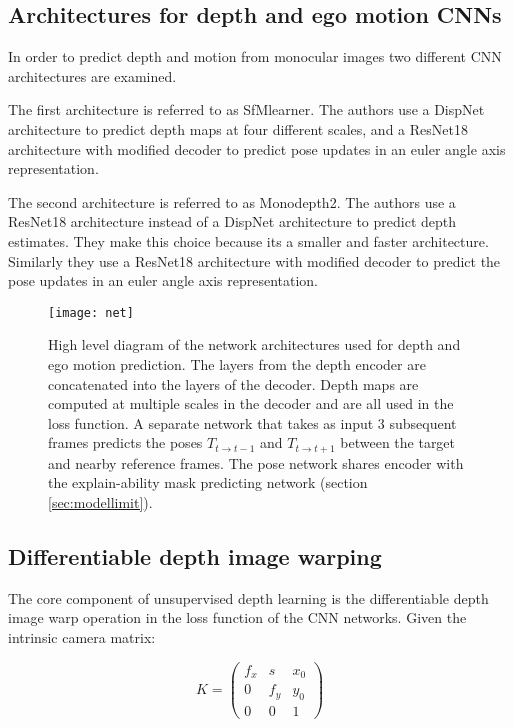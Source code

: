 

\subsection{Architectures for depth and ego motion CNNs}

In order to predict depth and motion from monocular images two different CNN architectures are examined.

The first architecture is referred to as SfMlearner\cite{sfmlearner}. The authors use a DispNet\cite{dispnet} architecture to predict depth maps at four different scales, and a ResNet18\cite{resnet} architecture with modified decoder to predict pose updates in an euler angle axis representation.

The second architecture is referred to as Monodepth2\cite{monodepth2}. The authors use a ResNet18 architecture instead of a DispNet architecture to predict depth estimates. They make this choice because its a smaller and faster architecture. Similarly they use a ResNet18 architecture with modified decoder to predict the pose updates in an euler angle axis representation.

\begin{figure}[H]
	\centering
	\texttt{[image: net]}
	\caption{High level diagram of the network architectures used for depth and ego motion prediction. The layers from the depth encoder are concatenated into the layers of the decoder. Depth maps are computed at multiple scales in the decoder and are all used in the loss function. A separate network that takes as input 3 subsequent frames predicts the poses $T_{t\rightarrow t-1}$ and $T_{t\rightarrow t+1}$ between the target and nearby reference frames. The pose network shares encoder with the explain-ability mask predicting network (section \ref{sec:modellimit}).}
	\label{fig:net}
\end{figure}

\newpage
\subsection{Differentiable depth image warping}
\label{sec:diffwarp}

The core component of unsupervised depth learning is the differentiable depth image warp operation in the loss function of the CNN networks. Given the intrinsic camera matrix:

\[
K = 
\begin{pmatrix}
f_x & s & x_0 \\
0 & f_y & y_0 \\
0 & 0   & 1
\end{pmatrix}
\]

